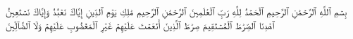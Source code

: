 بِسۡمِ ٱللَّهِ ٱلرَّحۡمَٰنِ ٱلرَّحِيمِ
ٱلۡحَمۡدُ لِلَّهِ رَبِّ ٱلۡعَٰلَمِينَ
ٱلرَّحۡمَٰنِ ٱلرَّحِيمِ
مَٰلِكِ يَوۡمِ ٱلدِّينِ
إِيَّاكَ نَعۡبُدُ وَإِيَّاكَ نَسۡتَعِينُ
ٱهۡدِنَا ٱلصِّرَٰطَ ٱلۡمُسۡتَقِيمَ
صِرَٰطَ ٱلَّذِينَ أَنۡعَمۡتَ عَلَيۡهِمۡ غَيۡرِ ٱلۡمَغۡضُوبِ عَلَيۡهِمۡ وَلَا ٱلضَّآلِّينَ